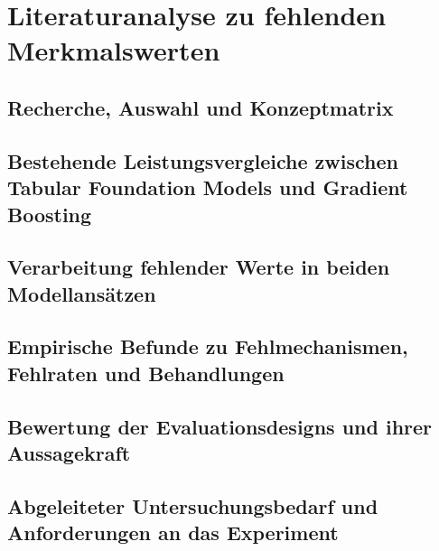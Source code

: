 \section{Literaturanalyse zu fehlenden Merkmalswerten}\label{sec:literatur}

\subsection{Recherche, Auswahl und Konzeptmatrix}\label{sec:literatur-vorgehen}

\subsection{Bestehende Leistungsvergleiche zwischen Tabular Foundation Models und Gradient Boosting}\label{sec:literatur-vergleiche}

\subsection{Verarbeitung fehlender Werte in beiden Modellansätzen}\label{sec:literatur-verarbeitung}

\subsection{Empirische Befunde zu Fehlmechanismen, Fehlraten und Behandlungen}\label{sec:literatur-befunde}

\subsection{Bewertung der Evaluationsdesigns und ihrer Aussagekraft}\label{sec:literatur-bewertung}

\subsection{Abgeleiteter Untersuchungsbedarf und Anforderungen an das Experiment}\label{sec:literatur-bedarf}
